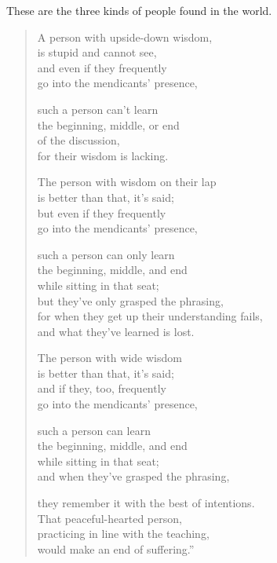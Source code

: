 \documentclass[12pt,openany]{book}%
\begin{document}
These are the three kinds of people found in the world. 

\begin{verse}%
A person with upside-down wisdom, \\
is stupid and cannot see, \\
and even if they frequently \\
go into the mendicants’ presence, 

such a person can’t learn \\
the beginning, middle, or end \\
of the discussion, \\
for their wisdom is lacking. 

The person with wisdom on their lap \\
is better than that, it’s said; \\
but even if they frequently \\
go into the mendicants’ presence, 

such a person can only learn \\
the beginning, middle, and end \\
while sitting in that seat; \\
but they’ve only grasped the phrasing, \\
for when they get up their understanding fails, \\
and what they’ve learned is lost. 

The person with wide wisdom \\
is better than that, it’s said; \\
and if they, too, frequently \\
go into the mendicants’ presence, 

such a person can learn \\
the beginning, middle, and end \\
while sitting in that seat; \\
and when they’ve grasped the phrasing, 

they remember it with the best of intentions. \\
That peaceful-hearted person, \\
practicing in line with the teaching, \\
would make an end of suffering.” 

%
\end{verse}
\end{document}
